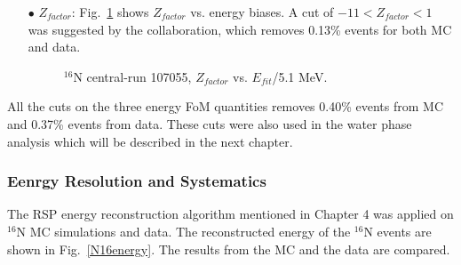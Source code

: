 \begin{itemize}
	\item[$\bullet$]$Z_{factor}$:
	Fig.~\ref{energyFOM_Zfactor} shows $Z_{factor}$ vs. energy biases. A cut of $-11<Z_{factor}<1$ was suggested by the collaboration, which removes 0.13\% events for both MC and data.		
	\begin{figure}[!htb]
		\centering
		\caption{$^{16}$N central-run 107055, $Z_{factor}$ vs. $E_{fit}$/5.1 MeV.}
		\label{energyFOM_Zfactor}
	\end{figure}
	
	
\end{itemize}

All the cuts on the three energy FoM quantities removes 0.40\% events from MC and 0.37\% events from data. These cuts were also used in the water phase analysis which will be described in the next chapter.

\subsubsection{Eenrgy Resolution and Systematics}
The RSP energy reconstruction algorithm mentioned in Chapter 4 was applied on $^{16}$N MC simulations and data. 
The reconstructed energy of the $^{16}$N events are shown in Fig.~\ref{N16energy}. The results from the MC and the data are compared.

